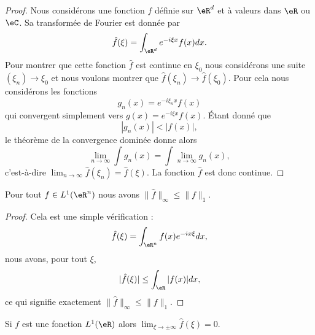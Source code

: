 \begin{proof}
    Nous considérons une fonction \( f\) définie sur \( \eR^d\) et à valeurs dans \( \eR\) ou \( \eC\). Sa transformée de Fourier est donnée par
    \begin{equation}
        \hat f(\xi)=\int_{\eR^d} e^{-i\xi x}f(x)dx.
    \end{equation}
    Pour montrer que cette fonction \( \hat f\) est continue en \( \xi_0\) nous considérons une suite \( (\xi_n)\to \xi_0\) et nous voulons montrer que \( \hat f(\xi_n)\to\hat f(\xi_0)\). Pour cela nous considérons les fonctions
\begin{equation}
    g_n(x)= e^{-i\xi_nx}f(x)
\end{equation}
qui convergent simplement vers \( g(x)= e^{-i\xi x}f(x)\). Étant donné que
\begin{equation}
    | g_n(x) |<| f(x) |,
\end{equation}
le théorème de la convergence dominée donne alors
\begin{equation}
    \lim_{n\to \infty} \int g_n(x)=\int\lim_{n\to \infty } g_n(x),
\end{equation}
c'est-à-dire \( \lim_{n\to \infty} \hat f(\xi_n)=\hat f(\xi)\). La fonction \( \hat f\) est donc continue.
\end{proof}

\begin{lemma}       \label{LEMooCBPTooYlcbrR}
    Pour tout \( f\in L^1(\eR^n)\) nous avons \( \| \hat f \|_{\infty}\leq \| f \|_1\).
\end{lemma}

\begin{proof}
    Cela est une simple vérification :
    \begin{equation}
        \hat f(\xi)=\int_{\eR^n}f(x) e^{-ix\xi}dx,
    \end{equation}
    nous avons, pour tout \( \xi\),
    \begin{equation}
        | \hat f(\xi) |\leq\int_{\eR}| f(x) |dx,
    \end{equation}
    ce qui signifie exactement \( \| \hat f \|_{\infty}\leq \| f \|_1\).
\end{proof}

\begin{lemma}     \label{LesmRLaxXkQV}
    Si \( f\) est une fonction \( L^1(\eR)\) alors \( \lim_{\xi\to\pm\infty} \hat f(\xi)=0\).
\end{lemma}


